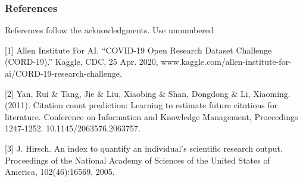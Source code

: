 \documentclass{article} %
\begin{document}
\subsubsection*{References}

References follow the acknowledgments. Use unnumbered 

\small{
[1] Allen Institute For AI. “COVID-19 Open Research Dataset Challenge (CORD-19).” Kaggle, CDC, 25 Apr. 2020, www.kaggle.com/allen-institute-for-ai/CORD-19-research-challenge.

[2] Yan, Rui \& Tang, Jie \& Liu, Xiaobing \& Shan, Dongdong \& Li, Xiaoming. (2011). Citation count prediction: Learning to estimate future citations for literature. {\itInternational Conference on  Information and Knowledge Management, Proceedings} 1247-1252. 10.1145/2063576.2063757. 

[3] J. Hirsch. An index to quantify an individual’s scientific
research output. Proceedings of the National Academy of
Sciences of the United States of America, 102(46):16569,
2005.
}
\end{document}
